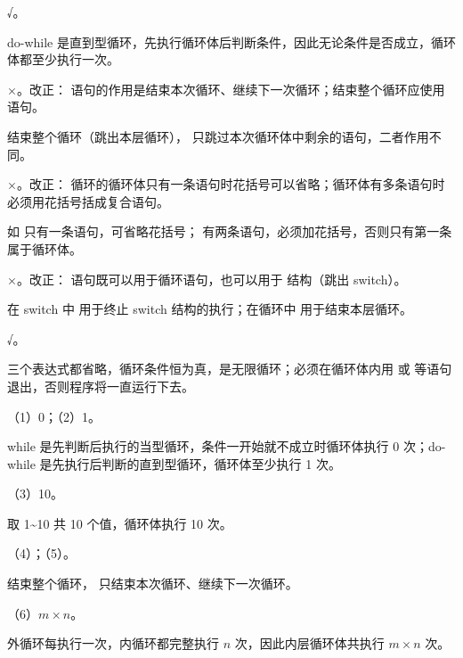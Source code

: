 \documentclass[a4paper,11pt]{article}
\begin{document}
\q √。\begin{analysis}do-while 是直到型循环，先执行循环体后判断条件，因此无论条件是否成立，循环体都至少执行一次。\end{analysis}

\q ×。改正： 语句的作用是结束本次循环、继续下一次循环；结束整个循环应使用  语句。\begin{analysis} 结束整个循环（跳出本层循环）， 只跳过本次循环体中剩余的语句，二者作用不同。\end{analysis}

\q ×。改正： 循环的循环体只有一条语句时花括号可以省略；循环体有多条语句时必须用花括号括成复合语句。\begin{analysis}如  只有一条语句，可省略花括号； 有两条语句，必须加花括号，否则只有第一条属于循环体。\end{analysis}

\q ×。改正： 语句既可以用于循环语句，也可以用于  结构（跳出 switch）。\begin{analysis}在 switch 中  用于终止 switch 结构的执行；在循环中  用于结束本层循环。\end{analysis}

\q √。\begin{analysis} 三个表达式都省略，循环条件恒为真，是无限循环；必须在循环体内用  或  等语句退出，否则程序将一直运行下去。\end{analysis}


\q （1）0；（2）1。\begin{analysis}while 是先判断后执行的当型循环，条件一开始就不成立时循环体执行 0 次；do-while 是先执行后判断的直到型循环，循环体至少执行 1 次。\end{analysis}

\q （3）10。\begin{analysis} 取 1\textasciitilde 10 共 10 个值，循环体执行 10 次。\end{analysis}

\q （4）；（5）。\begin{analysis} 结束整个循环， 只结束本次循环、继续下一次循环。\end{analysis}

\q （6）$m\times n$。\begin{analysis}外循环每执行一次，内循环都完整执行 $n$ 次，因此内层循环体共执行 $m\times n$ 次。\end{analysis}
\end{document}
